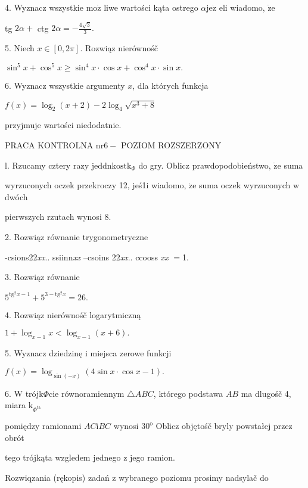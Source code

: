 \documentclass[a4paper,12pt]{article}
\begin{document}
4. Wyznacz wszystkie $\mathrm{m}\mathrm{o}\dot{\mathrm{z}}$ liwe wartości kąta ostrego $\alpha \mathrm{j}\mathrm{e}\dot{\mathrm{z}}$ eli wiadomo, $\dot{\mathrm{z}}\mathrm{e}$

tg $2\alpha+$ ctg $2\displaystyle \alpha=-\frac{4\sqrt{3}}{3}.$

5. Niech $x\in[0,2\pi]$. Rozwiąz nierównośč

$\sin^{5}x+\cos^{5}x\geq\sin^{4}x\cdot\cos x+\cos^{4}x\cdot\sin x.$

6. Wyznacz wszystkie argumenty $x$, dla których funkcja

$f(x)=\log_{2}(x+2)-2\log_{4}\sqrt{x^{3}+8}$

przyjmuje wartości niedodatnie.




PRACA KONTROLNA $\mathrm{n}\mathrm{r} 6-$ POZIOM ROZSZERZONY

l. Rzucamy cztery razy $\mathrm{j}\mathrm{e}\mathrm{d}\mathrm{d}\mathrm{n}\mathrm{k}\mathrm{o}\mathrm{s}\mathrm{t}\mathrm{k}_{\Phi}$ do gry. Oblicz prawdopodobieństwo, $\dot{\mathrm{z}}\mathrm{e}$ suma

wyrzuconych oczek przekroczy 12, jeś1i wiadomo, $\dot{\mathrm{z}}\mathrm{e}$ suma oczek wyrzuconych $\mathrm{w}$ dwóch

pierwszych rzutach wynosi 8.

2. Rozwiąz równanie trygonometryczne

-csions22{\it xx}.. ssiinn{\it xx} --csoins 22{\it xx}.. ccooss {\it xx} $=$1.

3. Rozwiąz równanie

$5^{\mathrm{t}\mathrm{g}^{2}x-1}+5^{3-\mathrm{t}\mathrm{g}^{2}x}=26.$

4. Rozwiąz nierównośč logarytmiczną

$1+\log_{x-1}x<\log_{x-1}(x+6).$

5. Wyznacz dziedzinę $\mathrm{i}$ miejsca zerowe funkcji

$f(x)=\log_{\sin(-x)}(4\sin x\cdot\cos x-1).$

6. $\mathrm{W}$ trójk$\Phi$cie równoramiennym $\triangle ABC$, którego podstawa $AB$ ma dlugośč 4, miara $\mathrm{k}_{\Phi^{\mathrm{t}\mathrm{a}}}$

pomiędzy ramionami $AC\mathrm{i}BC$ wynosi $30^{\mathrm{o}}$ Oblicz objętośč bryly powstałej przez obrót

tego trójkąta wzgledem jednego $\mathrm{z}$ jego ramion.

Rozwiqzania (rękopis) zadań z wybranego poziomu prosimy nadsylač do
\end{document}
